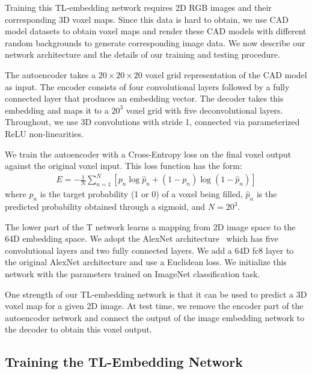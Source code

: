 \documentclass[runningheads]{llncs}
\begin{document}
Training this TL-embedding network requires 2D RGB images and their corresponding 3D voxel maps.
Since this data is hard to obtain, we use CAD model datasets to obtain voxel
maps and render these CAD models with different random backgrounds to generate
corresponding image data. We now describe our network architecture and the
details of our training and testing procedure.

The autoencoder takes a $20\times20\times20$%
voxel grid representation
of the CAD model as input. The encoder consists of four convolutional layers
followed by a fully connected layer that produces an embedding vector.
The decoder takes this embedding and maps it to a 
$20^3$ voxel grid with five deconvolutional layers. Throughout, we
use 3D convolutions with stride 1, connected via parameterized
ReLU \cite{he2015delving} non-linearities.

We train the autoencoder with a Cross-Entropy loss on the
final voxel output against the original voxel input. This loss function has
the form:
\begin{eqnarray}\label{eq:loss}
E = -\frac{1}{N} \sum_{n=1}^{N} [p_n \log \hat{p}_n + (1 - p_n) \log(1 - \hat{p}_n)]
\end{eqnarray}
where $p_n$ is the target
probability (1 or 0) of a voxel being filled, $\hat{p}_n$ is the predicted probability obtained through
a sigmoid, and $N = 20^3$.

The lower part of the T
network learns a mapping from 2D image space to the 64D embedding
space. We adopt the AlexNet architecture~\cite{AlexNet} which has five
convolutional layers and two fully connected layers. We add
a 64D fc8 layer to the original AlexNet architecture and use a
Euclidean loss. We initialize this network with the parameters
trained on ImageNet \cite{deng2009imagenet} classification task.

One strength of our TL-embedding network is that it can be used to
predict a 3D voxel map for a given 2D image. 
At test time, we remove
the encoder part of the autoencoder 
network and connect the output of the image
embedding network to the decoder to obtain this voxel output.

\subsection{Training the TL-Embedding Network}
\end{document}

